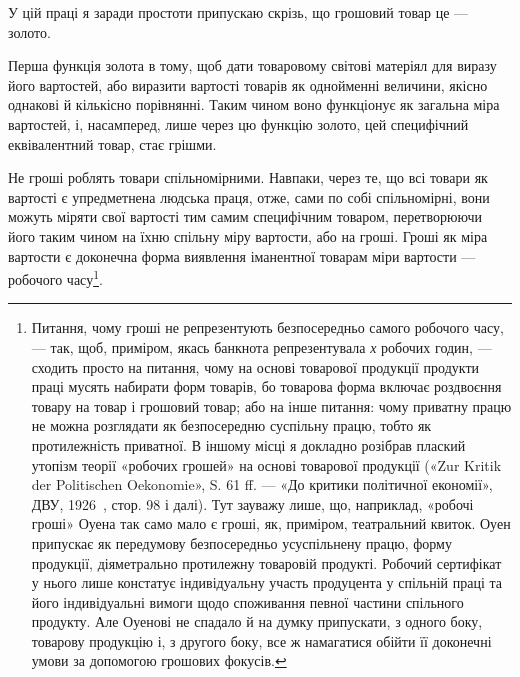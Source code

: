 
У цій праці я заради простоти припускаю скрізь, що грошовий
товар це — золото.

Перша функція золота в тому, щоб дати товаровому світові
матеріял для виразу його вартостей, або виразити вартості товарів
як однойменні величини, якісно однакові й кількісно порівнянні.
Таким чином воно функціонує як загальна міра вартостей,
і, насамперед, лише через цю функцію золото, цей специфічний
еквівалентний товар, стає грішми.

Не гроші роблять товари спільномірними. Навпаки, через
те, що всі товари як вартості є упредметнена людська праця, отже,
сами по собі спільномірні, вони можуть міряти свої вартості
тим самим специфічним товаром, перетворюючи його таким чином
на їхню спільну міру вартости, або на гроші. Гроші як міра
вартости є доконечна форма виявлення іманентної товарам міри
вартости — робочого часу\footnote{
Питання, чому гроші не репрезентують безпосередньо самого робочого
часу, — так, щоб, приміром, якась банкнота репрезентувала \emph{х} робочих
годин, — сходить просто на питання, чому на основі товарової продукції
продукти праці мусять набирати форм товарів, бо товарова форма
включає роздвоєння товару на товар і грошовий товар; або на інше питання:
чому приватну працю не можна розглядати як безпосередню суспільну
працю, тобто як протилежність приватної. В іншому місці я докладно
розібрав плаский утопізм теорії «робочих грошей» на основі товарової
продукції («Zur Kritik der Politischen Oekonomie», S. 61 ff. — «До критики
політичної економії», ДВУ, 1926~, стор. 98 і далі). Тут зауважу лише,
що, наприклад, «робочі гроші» Оуена так само мало є гроші, як, приміром,
театральний квиток. Оуен припускає як передумову безпосередньо
усуспільнену працю, форму продукції, діяметрально протилежну товаровій
продукті. Робочий сертифікат у нього лише констатує індивідуальну
участь продуцента у спільній праці та його індивідуальні вимоги щодо споживання
певної частини спільного продукту. Але Оуенові не спадало й на
думку припускати, з одного боку, товарову продукцію і, з другого боку, все ж
намагатися обійти її доконечні умови за допомогою грошових фокусів.
}.

